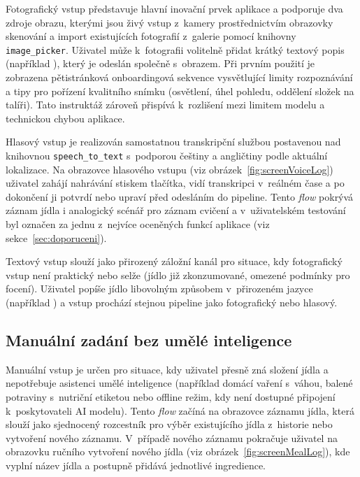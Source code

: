 Fotografický vstup představuje hlavní inovační prvek aplikace a podporuje dva zdroje obrazu, kterými jsou živý vstup z~kamery prostřednictvím obrazovky skenování a import existujících fotografií z~galerie pomocí knihovny \texttt{image\_picker}.
Uživatel může k~fotografii volitelně přidat krátký textový popis (například ), který je odeslán společně s~obrazem.
Při prvním použití je zobrazena pětistránková onboardingová sekvence vysvětlující limity rozpoznávání a tipy pro pořízení kvalitního snímku (osvětlení, úhel pohledu, oddělení složek na talíři).
Tato instruktáž zároveň přispívá k~rozlišení mezi limitem modelu a technickou chybou aplikace.

Hlasový vstup je realizován samostatnou transkripční službou postavenou nad knihovnou \texttt{speech\_to\_text} s~podporou češtiny a angličtiny podle aktuální lokalizace.
Na obrazovce hlasového vstupu (viz obrázek~\ref{fig:screenVoiceLog}) uživatel zahájí nahrávání stiskem tlačítka, vidí transkripci v~reálném čase a po dokončení ji potvrdí nebo upraví před odesláním do pipeline.
Tento \emph{flow} pokrývá záznam jídla i analogický scénář pro záznam cvičení a v~uživatelském testování byl označen za jednu z~nejvíce oceněných funkcí aplikace (viz sekce~\ref{sec:doporuceni}).

Textový vstup slouží jako přirozený záložní kanál pro situace, kdy fotografický vstup není praktický nebo selže (jídlo již zkonzumované, omezené podmínky pro focení).
Uživatel popíše jídlo libovolným způsobem v~přirozeném jazyce (například ) a vstup prochází stejnou pipeline jako fotografický nebo hlasový.

\subsection{Manuální zadání bez umělé inteligence}
\label{subsec:manualniVstup}

Manuální vstup je určen pro situace, kdy uživatel přesně zná složení jídla a nepotřebuje asistenci umělé inteligence (například domácí vaření s~váhou, balené potraviny s~nutriční etiketou nebo offline režim, kdy není dostupné připojení k~poskytovateli AI modelu).
Tento \emph{flow} začíná na obrazovce záznamu jídla, která slouží jako sjednocený rozcestník pro výběr existujícího jídla z~historie nebo vytvoření nového záznamu.
V~případě nového záznamu pokračuje uživatel na obrazovku ručního vytvoření nového jídla (viz obrázek~\ref{fig:screenMealLog}), kde vyplní název jídla a postupně přidává jednotlivé ingredience.

